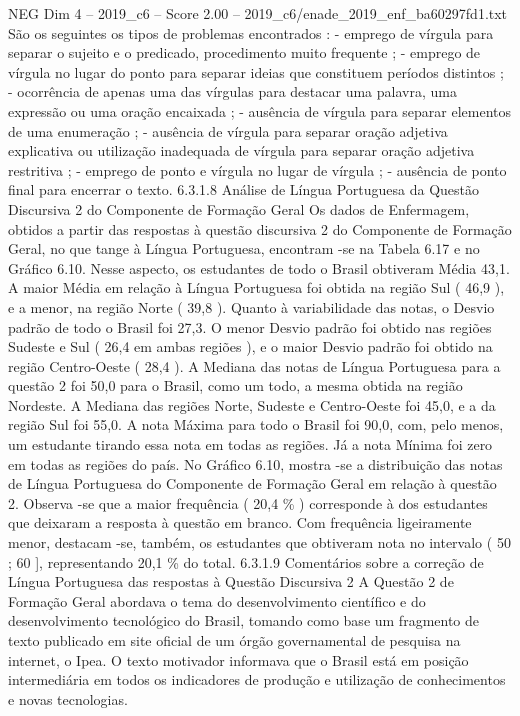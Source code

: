 \begin{textsample}{NEG Dim 4 – 2019\_c6 – Score 2.00 – 2019\_c6/enade\_2019\_enf\_ba60297fd1.txt}
São os seguintes os tipos de problemas encontrados : - emprego de vírgula para separar o sujeito e o predicado, procedimento muito frequente ; - emprego de vírgula no lugar do ponto para separar ideias que constituem períodos distintos ; - ocorrência de apenas uma das vírgulas para destacar uma palavra, uma expressão ou uma oração encaixada ; - ausência de vírgula para separar elementos de uma enumeração ; - ausência de vírgula para separar oração adjetiva explicativa ou utilização inadequada de vírgula para separar oração adjetiva restritiva ; - emprego de ponto e vírgula no lugar de vírgula ; - ausência de ponto final para encerrar o texto. 6.3.1.8 Análise de Língua Portuguesa da Questão Discursiva 2 do Componente de Formação Geral Os dados de Enfermagem, obtidos a partir das respostas à questão discursiva 2 do Componente de Formação Geral, no que tange à Língua Portuguesa, encontram -se na Tabela 6.17 e no Gráfico 6.10.
Nesse aspecto, os estudantes de todo o Brasil obtiveram Média 43,1.
A maior Média em relação à Língua Portuguesa foi obtida na região Sul ( 46,9 ), e a menor, na região Norte ( 39,8 ).
Quanto à variabilidade das notas, o Desvio padrão de todo o Brasil foi 27,3.
O menor Desvio padrão foi obtido nas regiões Sudeste e Sul ( 26,4 em ambas regiões ), e o maior Desvio padrão foi obtido na região Centro-Oeste ( 28,4 ).
A Mediana das notas de Língua Portuguesa para a questão 2 foi 50,0 para o Brasil, como um todo, a mesma obtida na região Nordeste.
A Mediana das regiões Norte, Sudeste e Centro-Oeste foi 45,0, e a da região Sul foi 55,0.
A nota Máxima para todo o Brasil foi 90,0, com, pelo menos, um estudante tirando essa nota em todas as regiões.
Já a nota Mínima foi zero em todas as regiões do país.
No Gráfico 6.10, mostra -se a distribuição das notas de Língua Portuguesa do Componente de Formação Geral em relação à questão 2.
Observa -se que a maior frequência ( 20,4 \% ) corresponde à dos estudantes que deixaram a resposta à questão em branco.
Com frequência ligeiramente menor, destacam -se, também, os estudantes que obtiveram nota no intervalo ( 50 ; 60 ], representando 20,1 \% do total. 6.3.1.9 Comentários sobre a correção de Língua Portuguesa das respostas à Questão Discursiva 2 A Questão 2 de Formação Geral abordava o tema do desenvolvimento científico e do desenvolvimento tecnológico do Brasil, tomando como base um fragmento de texto publicado em site oficial de um órgão governamental de pesquisa na internet, o Ipea.
O texto motivador informava que o Brasil está em posição intermediária em todos os indicadores de produção e utilização de conhecimentos e novas tecnologias.

\end{textsample}
